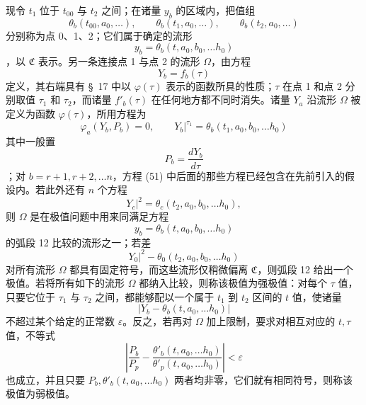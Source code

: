 \documentclass[11pt,a4paper,leqno]{article}
\begin{document}
现令 $t_1$ 位于 $t_{00}$ 与 $t_2$ 之间；在诸量 $y_b$ 的区域内，把值组
\[
\theta_b(t_{00},a_0,\ldots),
\qquad
\theta_b(t_1,a_0,\ldots),
\qquad
\theta_b(t_2,a_0,\ldots)
\]
分别称为点 0、1、2；它们属于确定的流形
\[
y_b=\theta_b(t,a_0,b_0,\ldots h_0)
\]
，以 $\mathfrak{C}$ 表示。另一条连接点 1 与点 2 的流形 $\Omega$，由方程
\[
Y_b=f_b(\tau)
\]
定义，其右端具有 \S~17 中以 $\varphi(\tau)$ 表示的函数所具的性质；$\tau$ 在点 1 和点 2 分别取值 $\tau_1$ 和 $\tau_2$，而诸量 $f'_b(\tau)$
在任何地方都不同时消失。诸量 $Y_a$ 沿流形 $\Omega$ 被定义为函数 $\varphi(\tau)$，所用方程为
\begin{equation}\tag{51}
\varphi_a(Y_b,P_b)=0,
\qquad
\left.Y_b\right|^{\tau_1}=\theta_b(t_1,a_0,b_0,\ldots h_0)
\end{equation}
其中一般置
\[
P_b=\frac{dY_b}{d\tau}
\]
；对 $b=r+1,r+2,\ldots n$，方程 (51) 中后面的那些方程已经包含在先前引入的假设内。若此外还有 $n$ 个方程
\[
\left.Y_c\right|^2=\theta_c(t_2,a_0,b_0,\ldots h_0),
\]
则 $\Omega$ 是在极值问题中用来同满足方程
\[
y_b=\theta_b(t,a_0,b_0,\ldots h_0)
\]
的弧段 12 比较的流形之一；若差
\[
\left.Y_0\right|^2-\theta_0(t_2,a_0,b_0,\ldots h_0)
\]
对所有流形 $\Omega$ 都具有固定符号，而这些流形仅稍微偏离 $\mathfrak{C}$，则弧段 12 给出一个极值。若将所有如下的流形 $\Omega$ 都纳入比较，则称该极值为强极值：对每个 $\tau$ 值，只要它位于 $\tau_1$ 与 $\tau_2$ 之间，都能够配以一个属于 $t_1$ 到 $t_2$ 区间的 $t$ 值，使诸量
\[
\left|Y_b-\theta_b(t,a_0,\ldots h_0)\right|
\]
不超过某个给定的正常数 $\varepsilon$。反之，若再对 $\Omega$ 加上限制，要求对相互对应的 $t,\tau$ 值，不等式
\begin{equation}\tag{52}
\left|
\frac{P_b}{P_p}
-\frac{\theta'_b(t,a_0,\ldots h_0)}{\theta'_p(t,a_0,\ldots h_0)}
\right|<\varepsilon
\end{equation}
也成立，并且只要 $P_b,\theta'_b(t,a_0,\ldots h_0)$ 两者均非零，它们就有相同符号，则称该极值为弱极值。
\end{document}
